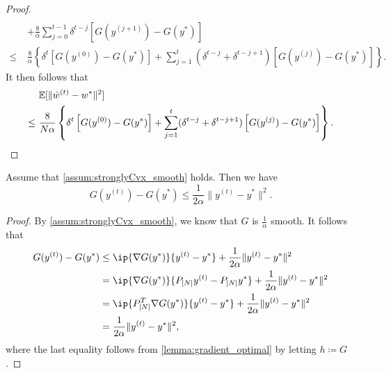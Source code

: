 \begin{proof}
\begin{align*}
        \\&+ \frac{8}{\alpha} \sum_{j=0}^{t-1} \delta^{t-j}\left[G(y^{(j+1)}) - G(y^*) \right]
        \\\leq~& \frac{8}{\alpha} \left\{ \delta^t\left[G(y^{(0)}) - G(y^*)\right] + \sum_{j=1}^t (\delta^{t-j} + \delta^{t-j+1})\left[G(y^{(j)}) - G(y^*)\right]\right\}.
    \end{align*}
     It then follows that 
     \begin{align*}
        &\mathbb{E}[\|\hat w^{(t)} - w^*\|^2] \\
        \leq~& \frac{8}{N\alpha} \left\{ \delta^t\left[G(y^{(0)}) - G(y^*)\right] + \sum_{j=1}^t (\delta^{t-j} + \delta^{t-j+1})\left[G(y^{(j)}) - G(y^*)\right]\right\}.
     \end{align*}
\end{proof}

\begin{lemma} \label{lemma:bound_dual_obj}
    Assume that \autoref{assum:stronglyCvx_smooth} holds. Then we have 
    \[G(y^{(t)}) - G(y^*) \leq \frac{1}{2\alpha}\|y^{(t)} - y^*\|^2.\]
\end{lemma}
\begin{proof}
    By \autoref{assum:stronglyCvx_smooth}, we know that $G$ is $\frac{1}{\alpha}$ smooth. It follows that 
    \begin{align*}
        G(y^{(t)}) - G(y^*) &\leq \ip{\nabla G(y^*)}{y^{(t)} - y^*} + \frac{1}{2\alpha}\|y^{(t)} - y^*\|^2 
        \\&= \ip{\nabla G(y^*)}{P_{[N]}y^{(t)} - P_{[N]}y^*} + \frac{1}{2\alpha}\|y^{(t)} - y^*\|^2
        \\&= \ip{ P_{[N]}^T \nabla G(y^*)}{y^{(t)} - y^*} + \frac{1}{2\alpha}\|y^{(t)} - y^*\|^2
        \\&= \frac{1}{2\alpha}\|y^{(t)} - y^*\|^2,
    \end{align*}
    where the last equality follows from \autoref{lemma:gradient_optimal} by letting $h \coloneqq G$. 
\end{proof}

